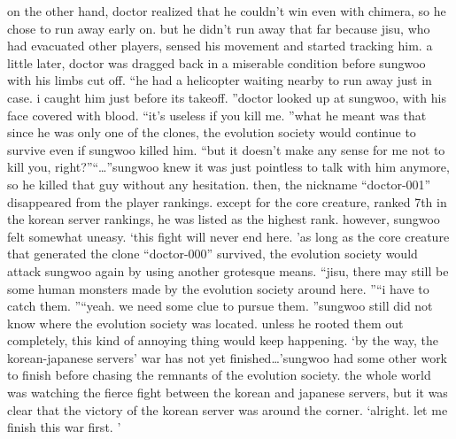 on the other hand, doctor realized that he couldn’t win even with chimera, so he chose to run away early on.
 but he didn’t run away that far because jisu, who had evacuated other players, sensed his movement and started tracking him.
a little later, doctor was dragged back in a miserable condition before sungwoo with his limbs cut off.
“he had a helicopter waiting nearby to run away just in case.
 i caught him just before its takeoff.
”doctor looked up at sungwoo, with his face covered with blood.
“it’s useless if you kill me.
”what he meant was that since he was only one of the clones, the evolution society would continue to survive even if sungwoo killed him.
“but it doesn’t make any sense for me not to kill you, right?”“…”sungwoo knew it was just pointless to talk with him anymore, so he killed that guy without any hesitation.
then, the nickname “doctor-001” disappeared from the player rankings.
except for the core creature, ranked 7th in the korean server rankings, he was listed as the highest rank.
however, sungwoo felt somewhat uneasy.
‘this fight will never end here.
’as long as the core creature that generated the clone “doctor-000” survived, the evolution society would attack sungwoo again by using another grotesque means.
“jisu, there may still be some human monsters made by the evolution society around here.
”“i have to catch them.
”“yeah.
 we need some clue to pursue them.
”sungwoo still did not know where the evolution society was located.
 unless he rooted them out completely, this kind of annoying thing would keep happening.
‘by the way, the korean-japanese servers’ war has not yet finished…’sungwoo had some other work to finish before chasing the remnants of the evolution society.
 the whole world was watching the fierce fight between the korean and japanese servers, but it was clear that the victory of the korean server was around the corner.
‘alright.
 let me finish this war first.
’

 